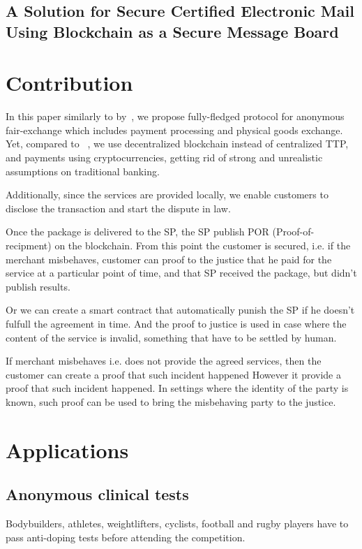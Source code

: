 \documentclass{article}
\begin{document}
\subsection{A Solution for Secure Certified Electronic Mail Using Blockchain as a Secure Message Board}


\section{Contribution}
In this paper similarly to by~\cite{birjoveanu2015anonymity}, we propose fully-fledged protocol for anonymous fair-exchange which includes payment processing and physical goods exchange. Yet, compared to ~\cite{birjoveanu2015anonymity}, we use decentralized blockchain instead of centralized TTP, and payments using cryptocurrencies, getting rid of strong and unrealistic assumptions on traditional banking.

Additionally, since the services are provided locally, we enable customers to disclose the transaction and start the dispute in law.

Once the package is delivered to the SP, the SP publish POR (Proof-of-recipment) on the blockchain. From this point the customer is secured, i.e. if the merchant misbehaves, customer can proof to the justice that he paid for the service at a particular point of time, and that SP received the package, but didn't publish results. 


Or we can create a smart contract that automatically punish the SP if he doesn't fulfull the agreement in time. And the proof to justice is used in case where the content of the service is invalid, something that have to be settled by human.

If merchant misbehaves i.e. does not provide the agreed services, then the customer can create a proof that such incident happened 
However it provide a proof that such incident happened. In settings where the identity of the party is known, such proof can be used to bring the misbehaving party to the justice.


\section{Applications}
\subsection{Anonymous clinical tests}
Bodybuilders, athletes,  weightlifters, cyclists, football and rugby players have to pass anti-doping tests before attending the competition. 
\end{document}
